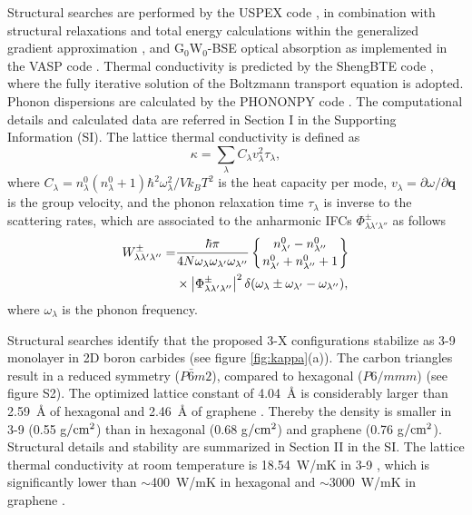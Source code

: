 \documentclass[journal=jpclcd,manuscript=article, layout=twocolumn]{achemso}
\begin{document}
	Structural searches are performed by the USPEX code \cite{UP1,UP2}, in combination with structural relaxations and total energy calculations within the generalized gradient approximation \cite{GGA, DFT-1,DFT-2}, and G$_0$W$_0$-BSE optical absorption \cite{2015-PRB-BSE} as implemented in the VASP code \cite{VASP-1,VASP-2,VASP-3}. Thermal conductivity is predicted by the ShengBTE code \cite{2003-PRB-Boltzmann, 2014-CPC-ShengBTE}, where the fully iterative solution of the Boltzmann transport equation is adopted. Phonon dispersions are calculated by the PHONONPY code \cite{2015-SM-PHONONPY,2001-RMP-phonon,2016-NPJ-phonon}.
	The computational details and calculated data are referred in Section I in the Supporting Information (SI). The lattice thermal conductivity is defined as \cite{2014-CPC-ShengBTE}
    \begin{equation}
    	\kappa = \sum_\lambda C_{\lambda} v_\lambda^2 \tau_\lambda, \label{eq:kappa}
    \end{equation}
    where $C_\lambda=n^0_\lambda(n^0_\lambda+1)\hbar^2\omega^2_\lambda/Vk_BT^2$ is the heat capacity per mode,  $v_\lambda=\partial\omega/\partial \bm{q}$ is the group velocity, and the phonon relaxation time $\tau_\lambda$ is inverse to the scattering rates, which are associated to the anharmonic IFCs $\Phi_{\lambda \lambda' \lambda''}^{\pm}$ as follows
    \begin{align}
    	W^{\pm}_{\lambda \lambda' \lambda''} =& \dfrac{\hbar \pi}{4N \omega_{\lambda}\omega_{\lambda'}\omega_{\lambda''}} \left\{ n^0_{\lambda'} -  n^0
    	_{\lambda''}\atop n^0_{\lambda'} +  n^0_{\lambda''} +1 \right\}\notag\\
    	&\times \left|\Phi_{\lambda \lambda' \lambda''}^{\pm}\right|^2\delta( \omega_{\lambda} \pm  \omega_{\lambda'} -  \omega_{\lambda''}), \label{eq:SRs}
    \end{align}
    where $\omega_{\lambda}$ is the phonon frequency.

	Structural searches identify that the proposed 3-X configurations stabilize as 3-9  monolayer in 2D boron carbides (see figure \ref{fig:kappa}(a)). The carbon triangles result in a reduced symmetry ($P\bar{6}m2$), compared to hexagonal  ($P6/mmm$) (see figure S2). The optimized lattice constant of \SI{4.04}{\angstrom} is considerably larger than \SI{2.59}{\angstrom} of hexagonal  \cite{2019-Carbon-BC3} and \SI{2.46}{\angstrom} of graphene \cite{2010-PRB-graphene-kappa}. Thereby the density is smaller in 3-9  (0.55 g$/\rm{cm^2}$) than in hexagonal  (0.68 g$/\rm{cm^2}$) and graphene (0.76 g$/\rm{cm^2}$). Structural details and stability are summarized in Section II in the SI. The lattice thermal conductivity at room temperature is \SI{18.54}{W/mK} in 3-9 , which is significantly lower than $\sim$\SI{400}{W/mK} in hexagonal  \cite{2019-Carbon-BC3} and $\sim$\SI{3000}{W/mK} in graphene \cite{2016-PRB-Si-kappa}.
\end{document}
